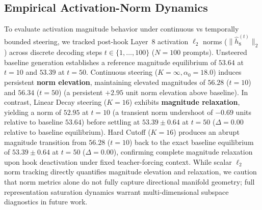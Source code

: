 \documentclass[conference]{IEEEtran}
\begin{document}
\begin{table}[t]
\caption{Statistical Significance \& Pairwise Contingency Matrix for High-Cap Natural Completion ($N_{\text{test}}=500$, \texttt{max\_new\_tokens=800}, Exact Binomial McNemar, $B=10,000$ Percentile Bootstrap, Seed=42)}
\label{tab:mcnemar}
\centering
{}
\end{table}

\subsection{Empirical Activation-Norm Dynamics}
To evaluate activation magnitude behavior under continuous vs temporally bounded steering, we tracked post-hook Layer~8 activation $\ell_2$ norms ($\|\hat{h}_8^{(t)}\|_2$) across discrete decoding steps $t \in \{1, \ldots, 100\}$ ($N=100$ prompts). Unsteered baseline generation establishes a reference magnitude equilibrium of $53.64$ at $t=10$ and $53.39$ at $t=50$. Continuous steering ($K=\infty, \alpha_0=18.0$) induces persistent \textbf{norm elevation}, maintaining elevated magnitudes of $56.28$ ($t=10$) and $56.34$ ($t=50$) (a persistent $+2.95$ unit norm elevation above baseline). In contrast, Linear Decay steering ($K=16$) exhibits \textbf{magnitude relaxation}, yielding a norm of $52.95$ at $t=10$ (a transient norm undershoot of $-0.69$ units relative to baseline $53.64$) before settling at $53.39 \pm 0.64$ at $t=50$ ($\Delta = 0.00$ relative to baseline equilibrium). Hard Cutoff ($K=16$) produces an abrupt magnitude transition from $56.28$ ($t=10$) back to the exact baseline equilibrium of $53.39 \pm 0.64$ at $t=50$ ($\Delta = 0.00$), confirming complete magnitude relaxation upon hook deactivation under fixed teacher-forcing context. While scalar $\ell_2$ norm tracking directly quantifies magnitude elevation and relaxation, we caution that norm metrics alone do not fully capture directional manifold geometry; full representation saturation dynamics warrant multi-dimensional subspace diagnostics in future work.
\end{document}
